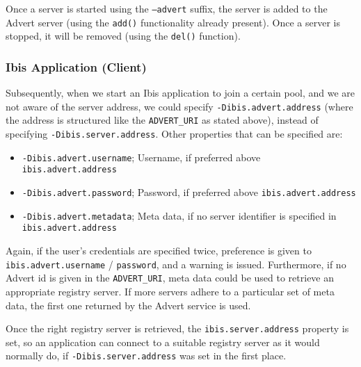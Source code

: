 Once a server is started using the \texttt{--advert} suffix, the server is added
to the Advert server (using the \texttt{add()} functionality already present).
Once a server is stopped, it will be removed (using the \texttt{del()}
function).

\subsubsection{Ibis Application (Client)}
Subsequently, when we start an Ibis application to join a certain pool, and we
are not aware of the server address, we could specify
\texttt{-Dibis.advert.address} (where the address is structured like the
\texttt{ADVERT\_URI} as stated above), instead of specifying
\texttt{-Dibis.server.address}. Other properties that can be specified are:

\begin{itemize}
  \item \texttt{-Dibis.advert.username}; Username, if preferred above
  	\texttt{ibis.advert.address}
  \item \texttt{-Dibis.advert.password}; Password, if preferred above
  	\texttt{ibis.advert.address} 
  \item \texttt{-Dibis.advert.metadata}; Meta data, if no server identifier is
  	specified in \newline \texttt{ibis.advert.address}
\end{itemize}

Again, if the user's credentials are specified twice, preference is given to
\texttt{ibis.advert.username} / \texttt{password}, and a warning is issued.
Furthermore, if no Advert id is given in the \texttt{ADVERT\_URI}, meta data
could be used to retrieve an appropriate registry server. If more servers
adhere to a particular set of meta data, the first one returned by the Advert
service is used.

Once the right registry server is retrieved, the \texttt{ibis.server.address}
property is set, so an application can connect to a suitable registry server as
it would normally do, if \texttt{-Dibis.server.address} was set in the first
place.


